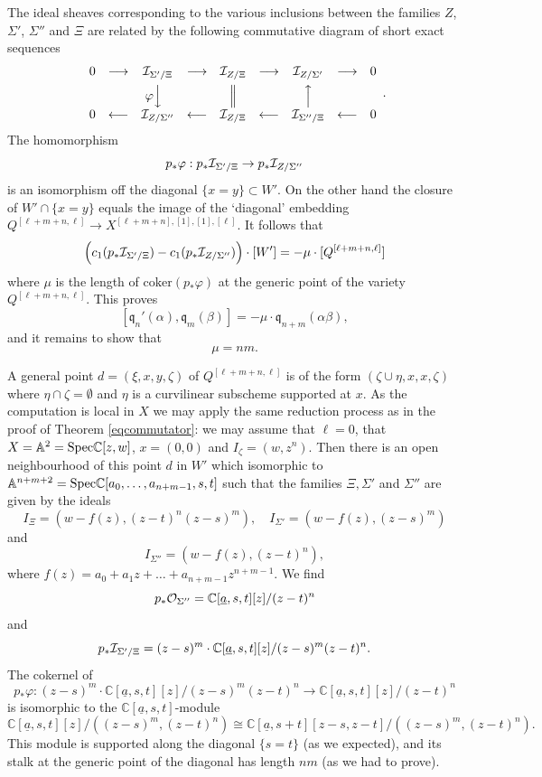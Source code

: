 \documentclass[twoside,11pt]{article}
\newcommand{\ki}{{\cal I}}
\newcommand{\ko}{{\cal O}}
\newcommand{\IA}{{\mathbb A}}
\newcommand{\IC}{{\mathbb C}}
\newcommand{\gothq}{{\mathfrak q}}
\newcommand{\isom}{\cong}
\newcommand{\Spec}{{\rm Spec}}
\newcommand{\qq}{\gothq}
\renewcommand{\phi}{\varphi}
\newcommand{\lra}{\longrightarrow}
\newcommand{\lla}{\longleftarrow}
\begin{document}
The ideal sheaves corresponding to the various inclusions between the families $Z$,
$\Sigma'$, $\Sigma''$ and $\Xi$ are related by the following commutative
diagram of short exact sequences
$$\begin{array}{ccccccccc}
0&\lra&\ki_{\Sigma'/\Xi}&\lra&\ki_{Z/\Xi}&\lra&\ki_{Z/\Sigma'}&\lra&0\\[1ex]
&&\phi\Big\downarrow\phantom{\phi}&&\Big\|&&\Big\uparrow\\[.5ex]
0&\lla&\ki_{Z/\Sigma''}&\lla&\ki_{Z/\Xi}&\lla&\ki_{\Sigma''/\Xi}&\lla&0\\
\end{array}.$$
The homomorphism
$$p_*\phi:p_*\ki_{\Sigma'/\Xi}\to p_*\ki_{Z/\Sigma''}$$
is an isomorphism off the diagonal $\{x=y\}\subset W'$. On the other hand
the closure of $W'\cap\{x=y\}$ equals the image of the `diagonal' embedding
$Q^{[\ell+m+n,\ell]}\to X^{[\ell+m+n],[1],[1],[\ell]}$.
It follows that
$$\Big(c_1(p_*\ki_{\Sigma'/\Xi})-c_1(p_*\ki_{Z/\Sigma''})\Big)\cdot[W']=-\mu
\cdot[Q^{[\ell+m+n,\ell]}]$$
where $\mu$ is the length of $\mbox{coker}(p_*\phi)$ at the generic point of
the  variety $Q^{[\ell+m+n,\ell]}$.
This proves
$$[\qq_n'(\alpha),\qq_m(\beta)]=-\mu\cdot\qq_{n+m}(\alpha\beta),$$
and it remains to show that
$$\mu=nm.$$

A general point $d=(\xi,x,y,\zeta)$ of $Q^{[\ell+m+n,\ell]}$ is of the form
$(\zeta\cup\eta,x,x,\zeta)$ where $\eta\cap\zeta=\emptyset$ and $\eta$ is
a curvilinear subscheme supported at $x$. As the computation is local in $X$
we may apply the same reduction process as in the proof of Theorem \ref{eqcommutator}: we may assume that $\ell=0$,
that $X=\IA^2=\Spec\IC[z,w]$, $x=(0,0)$ and $I_\zeta=(w,z^n)$. Then there is an 
open neighbourhood of this point $d$ in $W'$ which isomorphic to $\IA^{n+m+2}=\Spec\IC[a_0,\ldots,a_{n+m-1},s,t]$
such that the families $\Xi,\Sigma'$ and $\Sigma''$ are given by the ideals
$$I_\Xi=(w-f(z),(z-t)^n(z-s)^m),\quad I_{\Sigma'}=(w-f(z),(z-s)^m)$$
and
$$I_{\Sigma''}=(w-f(z),(z-t)^n),$$
where $f(z)=a_0+a_1z+\ldots+a_{n+m-1}z^{n+m-1}$. We find
$$p_*\ko_{\Sigma''}=\IC[\underline{a},s,t][z]/(z-t)^n$$
and 
$$p_*\ki_{\Sigma'/\Xi}=(z-s)^m\cdot\IC[\underline{a},s,t][z]/(z-s)^m(z-t)^n.$$
The cokernel of 
$$p_*\phi:(z-s)^m\cdot\IC[\underline{a},s,t][z]/(z-s)^m(z-t)^n
\lra\IC[\underline{a},s,t][z]/(z-t)^n$$
is isomorphic to the $\IC[\underline{a},s,t]$-module
$$\IC[\underline{a},s,t][z]/((z-s)^m,(z-t)^n)\isom
\IC[\underline{a},s+t][z-s,z-t]/((z-s)^m,(z-t)^n).$$ 
This module is supported along the diagonal $\{s=t\}$ (as we expected), and
its stalk at the generic point of the diagonal has length $nm$ (as we had
to prove). 
\end{document}
